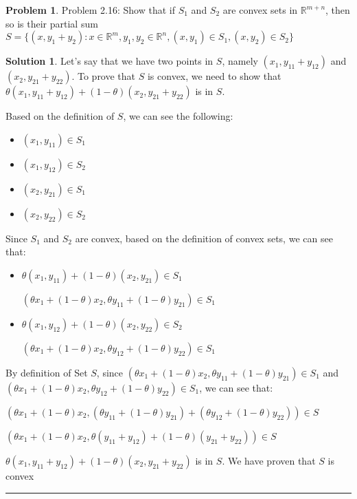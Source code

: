 \documentclass{article}
\theoremstyle{definition}
\newtheorem{problem}{Problem}
\def\fline{\rule{0.75\linewidth}{0.5pt}}
\newcommand{\finishline}{\begin{center}\fline\end{center}}
\newtheorem*{solution*}{Solution}
\newenvironment{solution}{\begin{solution*}}{{\finishline} \end{solution*}}
\begin{document}
\begin{problem}
Problem 2.16: \newline 
    Show that if $S_1$ and $S_2$ are convex sets in $\mathbb{R}^{m + n}$, then so is their partial sum \newline 
    $S = \{(x, y_1 + y_2) : x \in \mathbb{R}^m, y_1, y_2 \in \mathbb{R}^n, (x, y_1) \in S_1, (x, y_2) \in S_2 \}$

    \begin{solution}

    Let's say that we have two points in $S$, namely $(x_1, y_{11} + y_{12})$ and $(x_2, y_{21} + y_{22})$. To prove that $S$ is convex, we need to show that $\theta (x_1, y_{11} + y_{12}) + (1 - \theta) (x_2, y_{21} + y_{22})$ is in $S$.  

    Based on the definition of $S$, we can see the following: 
    \begin{itemize}
        \item $(x_1, y_{11}) \in S_1$
        \item $(x_1, y_{12}) \in S_2$
        \item $(x_2, y_{21}) \in S_1$
        \item $(x_2, y_{22}) \in S_2$
    \end{itemize}

    Since $S_1$ and $S_2$ are convex, based on the definition of convex sets, we can see that:
    \begin{itemize}
        \item $\theta (x_1, y_{11}) + (1 - \theta) (x_2, y_{21}) \in S_1$

        $ (\theta x_1 + (1 - \theta) x_2, \theta y_{11} + (1 - \theta) y_{21} ) \in S_1$
        \item $\theta (x_1, y_{12})  + (1 - \theta)(x_2, y_{22}) \in S_2$

        $ (\theta x_1 + (1 - \theta) x_2, \theta y_{12} + (1 - \theta) y_{22} ) \in S_1$
    \end{itemize}

    By definition of Set $S$, since $ (\theta x_1 + (1 - \theta) x_2, \theta y_{11} + (1 - \theta) y_{21} ) \in S_1$ and $ (\theta x_1 + (1 - \theta) x_2, \theta y_{12} + (1 - \theta) y_{22} ) \in S_1$, we can see that: \newline 

    $ (\theta x_1 + (1 - \theta) x_2, (\theta y_{11} + (1 - \theta) y_{21}) + (\theta y_{12} + (1 - \theta) y_{22}) ) \in S$ \newline 

        $ (\theta x_1 + (1 - \theta) x_2, \theta (y_{11} + y_{12}) + (1 - \theta) (y_{21} + y_{22}) ) \in S$ \newline 

$\theta (x_1, y_{11} + y_{12}) + (1 - \theta) (x_2, y_{21} + y_{22})$ is in $S$.  We have proven that $S$ is convex
    
        
    \end{solution}
\end{problem}
\end{document}
